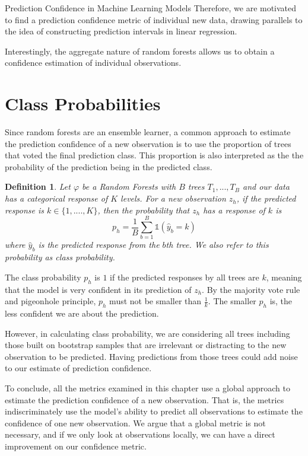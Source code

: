 \documentclass[12pt]{pom_thesis}
\newtheorem{definition}{Definition}[section]
\begin{document}
\begin{chapter}{Prediction Confidence in Machine Learning Models}
Therefore, we are motivated to find a prediction confidence metric of individual new data, drawing parallels to the idea of constructing prediction intervals in linear regression. 

Interestingly, the aggregate nature of random forests allows us to obtain a confidence estimation of individual observations. 

\section{Class Probabilities}
Since random forests are an ensemble learner, a common approach to estimate the prediction confidence of a new observation is to use the proportion of trees that voted the final prediction class. This proportion is also interpreted as the the probability of the prediction being in the predicted class.
\begin{definition}
Let $\varphi$ be a Random Forests with $B$ trees $T_1,...,T_B$ and our data has a categorical response of $K$ levels. For a new observation $z_h$, if the predicted response is $k \in \{1,....,K\}$, then the probability that $z_h$ has a response of $k$ is
\begin{equation}
\label{prob}
    p_h=\frac{1}{B}\sum_{b=1}^B \mathbb{1} (\hat{y}_b=k)
\end{equation}
where $\hat{y}_b$ is the predicted response from the $b$th tree.
We also refer to this probability as class probability.
\end{definition}

The class probability  $p_h$ is $1$ if the predicted responses by all trees are $k$, meaning that the model is very confident in its prediction of $z_h$. By the majority vote rule and pigeonhole principle, $p_h$ must not be smaller than $\frac{1}{k}$.  The smaller $p_h$ is, the less confident we are about the prediction.

However, in calculating class probability, we are considering all trees including those built on bootstrap samples that are irrelevant or distracting to the new observation to be predicted. Having predictions from those trees could add noise to our estimate of prediction confidence. 

To conclude, all the metrics examined in this chapter use a global approach to estimate the prediction confidence of a new observation. That is, the metrics indiscriminately use the model's ability to predict all observations to estimate the confidence of one new observation. We argue that a global metric is not necessary, and if we only look at observations locally, we can have a direct improvement on our confidence metric.  
\end{chapter}
\end{document}
